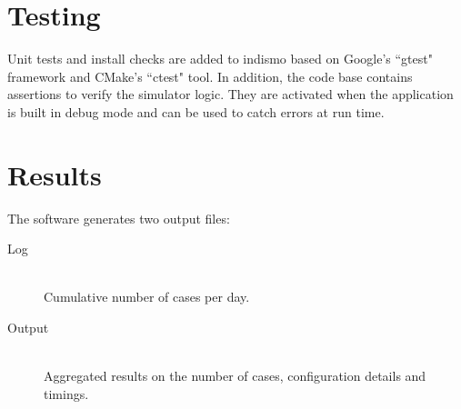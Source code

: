 \section{Testing}
Unit tests and install checks are added to indismo based on Google's ``gtest" framework and CMake's ``ctest" tool. 
In addition, the code base contains assertions to verify the simulator logic. 
They are activated when the application is built in debug mode and can be used to catch errors at run time. 


\section{Results}
\label{section:Results}

The software generates two output files:
\begin{description}
	\item [Log] \ \\
	Cumulative number of cases per day.
	\item [Output] \ \\
	Aggregated results on the number of cases, configuration details and timings.
\end{description}	
	
	
	
